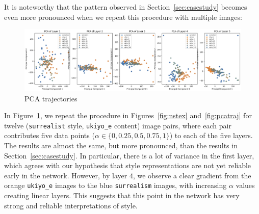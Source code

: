 \documentclass[twocolumn]{article}
\begin{document}
It is noteworthy that the pattern observed in Section~\ref{sec:casestudy} becomes even more pronounced when we repeat this procedure with multiple images: 

\begin{figure}[H]
    \centering
    \includegraphics[width=18cm]{images/manytrajectories.png}
    \caption{PCA trajectories}
    \label{fig:pcatrajs}
\end{figure}

In Figure~\ref{fig:pcatrajs}, we repeat the procedure in Figures~\ref{fig:nstex} and~\ref{fig:pcatraj} for twelve (\verb|surrealist| style, \verb|ukiyo_e| content) image pairs, where each pair contributes five data points ($\alpha\in \{0,0.25,0.5,0.75,1\}$) to each of the five layers. The results are almost the same, but more pronounced, than the results in Section~\ref{sec:casestudy}. In particular, there is a lot of variance in the first layer, which agrees with our hypothesis that style representations are not yet reliable early in the network. However, by layer $4$, we observe a clear gradient from the orange \verb|ukiyo_e| images to the blue \verb|surrealism| images, with increasing $\alpha$ values creating linear layers. This suggests that this point in the network has very strong and reliable interpretations of style. 
\end{document}
